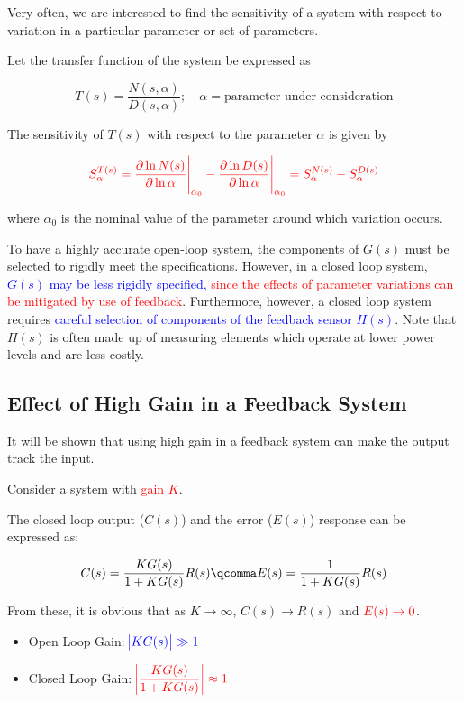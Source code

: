 \documentclass[
  14pt,
  a4paper,
  oneside,
  open=any,
  a4paper,
  14pt]{report}
\begin{document}
Very often, we are interested to find the sensitivity of a system with
respect to variation in a particular parameter or set of parameters.

Let the transfer function of the system be expressed as

\[
    T(s) = \dfrac{N(s,\alpha)}{D(s,\alpha)}; \quad \alpha = \text{parameter under consideration}
\]

The sensitivity of \(T(s)\) with respect to the parameter \(\alpha\) is
given by

\[
    \textcolor{red}{S^{T(s)}_{\alpha} = \pdv{\ln{N(s)}}{\ln{\alpha}}\Bigg|_{\alpha_0} - \pdv{\ln{D(s)}}{\ln{\alpha}}\Bigg|_{\alpha_0} = S^{N(s)}_{\alpha} - S^{D(s)}_{\alpha}}
\]

where \(\alpha_0\) is the nominal value of the parameter around which
variation occurs.

To have a highly accurate open-loop system, the components of \(G(s)\)
must be selected to rigidly meet the specifications. However, in a
closed loop system, \textcolor{blue}{\(G(s)\) may be less rigidly
specified,} \textcolor{red}{since the effects of parameter variations
can be mitigated by use of feedback}. Furthermore, however, a closed
loop system requires \textcolor{blue}{careful selection of components of
the feedback sensor \(H(s)\)}. Note that \(H(s)\) is often made up of
measuring elements which operate at lower power levels and are less
costly.

\subsection{Effect of High Gain in a Feedback
System}\label{effect-of-high-gain-in-a-feedback-system}

It will be shown that using high gain in a feedback system can make the
output track the input.

Consider a system with \textcolor{red}{gain \(K\)}.

The closed loop output (\(C(s)\)) and the error (\(E(s)\)) response can
be expressed as:

\[
    C(s) = \dfrac{KG(s)}{1+KG(s)}R(s) \qcomma E(s) = \dfrac{1}{1+KG(s)}R(s)
\]

From these, it is obvious that as \(K \to \infty\), \(C(s) \to R(s)\)
and \(\textcolor{red}{E(s) \to 0}\).

\begin{itemize}
\item
  Open Loop Gain: \(\textcolor{blue}{\abs{KG(s)}\gg 1}\)
\item
  Closed Loop Gain:
  \(\textcolor{red}{\abs{\dfrac{KG(s)}{1+KG(s)}}\approx 1}\)
\end{itemize}
\end{document}
